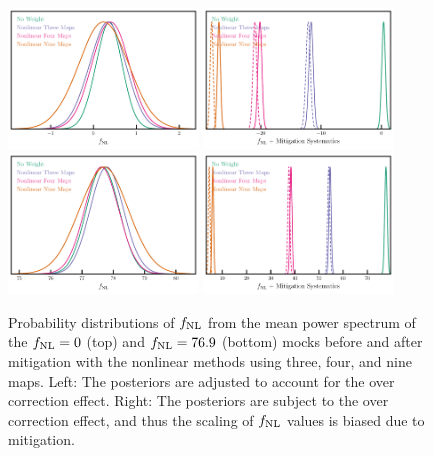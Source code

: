 \begin{figure}
\centering
\includegraphics[width=0.45\textwidth]{figures/mcmc_cont.pdf}
\includegraphics[width=0.45\textwidth]{figures/mcmc_contnoshift.pdf}
\includegraphics[width=0.45\textwidth]{figures/mcmcp_cont.pdf}
\includegraphics[width=0.45\textwidth]{figures/mcmcp_contnoshift.pdf}
\caption{Probability distributions of $f_{\rm NL}$ from the mean power spectrum of the $f_{\rm NL}=0$ (top) and $f_{\rm NL}=76.9$ (bottom) mocks before and after mitigation with the nonlinear methods using three, four, and nine maps. Left: The posteriors are adjusted to account for the over correction effect. Right: The posteriors are subject to the over correction effect, and thus the scaling of $f_{\rm NL}$ values is biased due to mitigation.}\label{fig:contmcmc}
\end{figure}


